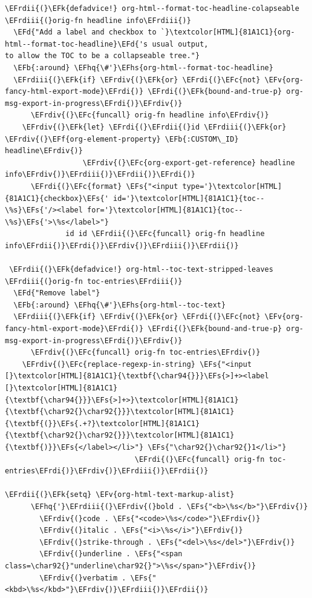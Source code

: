 \documentclass{scrartcl}
\newcommand{\EFk}[1]{\textcolor{EFk}{#1}} %
\newcommand{\EFd}[1]{\textcolor{EFd}{#1}} %
\newcommand{\EFs}[1]{\textcolor{EFs}{#1}} %
\newcommand{\EFb}[1]{\textcolor{EFb}{#1}} %
\newcommand{\EFc}[1]{\textcolor{EFc}{#1}} %
\newcommand{\EFv}[1]{\textcolor{EFv}{#1}} %
\newcommand{\EFf}[1]{\textcolor{EFf}{#1}} %
\newcommand{\EFhq}[1]{#1} %
\newcommand{\EFhs}[1]{#1} %
\newcommand{\EFrdi}[1]{#1} %
\newcommand{\EFrdii}[1]{#1} %
\newcommand{\EFrdiii}[1]{#1} %
\newcommand{\EFrdiv}[1]{#1} %
\begin{document}
\begin{Code}
\begin{Verbatim}[]
\EFrdii{(}\EFk{defadvice!} org-html--format-toc-headline-colapseable \EFrdiii{(}orig-fn headline info\EFrdiii{)}
  \EFd{"Add a label and checkbox to `}\textcolor[HTML]{81A1C1}{org-html--format-toc-headline}\EFd{'s usual output,
to allow the TOC to be a collapseable tree."}
  \EFb{:around} \EFhq{\#'}\EFhs{org-html--format-toc-headline}
  \EFrdiii{(}\EFk{if} \EFrdiv{(}\EFk{or} \EFrdi{(}\EFc{not} \EFv{org-fancy-html-export-mode}\EFrdi{)} \EFrdi{(}\EFk{bound-and-true-p} org-msg-export-in-progress\EFrdi{)}\EFrdiv{)}
      \EFrdiv{(}\EFc{funcall} orig-fn headline info\EFrdiv{)}
    \EFrdiv{(}\EFk{let} \EFrdi{(}\EFrdii{(}id \EFrdiii{(}\EFk{or} \EFrdiv{(}\EFf{org-element-property} \EFb{:CUSTOM\_ID} headline\EFrdiv{)}
                  \EFrdiv{(}\EFc{org-export-get-reference} headline info\EFrdiv{)}\EFrdiii{)}\EFrdii{)}\EFrdi{)}
      \EFrdi{(}\EFc{format} \EFs{"<input type='}\textcolor[HTML]{81A1C1}{checkbox}\EFs{' id='}\textcolor[HTML]{81A1C1}{toc--\%s}\EFs{'/><label for='}\textcolor[HTML]{81A1C1}{toc--\%s}\EFs{'>\%s</label>"}
              id id \EFrdii{(}\EFc{funcall} orig-fn headline info\EFrdii{)}\EFrdi{)}\EFrdiv{)}\EFrdiii{)}\EFrdii{)}

 \EFrdii{(}\EFk{defadvice!} org-html--toc-text-stripped-leaves \EFrdiii{(}orig-fn toc-entries\EFrdiii{)}
  \EFd{"Remove label"}
  \EFb{:around} \EFhq{\#'}\EFhs{org-html--toc-text}
  \EFrdiii{(}\EFk{if} \EFrdiv{(}\EFk{or} \EFrdi{(}\EFc{not} \EFv{org-fancy-html-export-mode}\EFrdi{)} \EFrdi{(}\EFk{bound-and-true-p} org-msg-export-in-progress\EFrdi{)}\EFrdiv{)}
      \EFrdiv{(}\EFc{funcall} orig-fn toc-entries\EFrdiv{)}
    \EFrdiv{(}\EFc{replace-regexp-in-string} \EFs{"<input [}\textcolor[HTML]{81A1C1}{\textbf{\char94{}}}\EFs{>]+><label [}\textcolor[HTML]{81A1C1}{\textbf{\char94{}}}\EFs{>]+>}\textcolor[HTML]{81A1C1}{\textbf{\char92{}\char92{}}}\textcolor[HTML]{81A1C1}{\textbf{(}}\EFs{.+?}\textcolor[HTML]{81A1C1}{\textbf{\char92{}\char92{}}}\textcolor[HTML]{81A1C1}{\textbf{)}}\EFs{</label></li>"} \EFs{"\char92{}\char92{}1</li>"}
                              \EFrdi{(}\EFc{funcall} orig-fn toc-entries\EFrdi{)}\EFrdiv{)}\EFrdiii{)}\EFrdii{)}

\EFrdii{(}\EFk{setq} \EFv{org-html-text-markup-alist}
      \EFhq{'}\EFrdiii{(}\EFrdiv{(}bold . \EFs{"<b>\%s</b>"}\EFrdiv{)}
        \EFrdiv{(}code . \EFs{"<code>\%s</code>"}\EFrdiv{)}
        \EFrdiv{(}italic . \EFs{"<i>\%s</i>"}\EFrdiv{)}
        \EFrdiv{(}strike-through . \EFs{"<del>\%s</del>"}\EFrdiv{)}
        \EFrdiv{(}underline . \EFs{"<span class=\char92{}"underline\char92{}">\%s</span>"}\EFrdiv{)}
        \EFrdiv{(}verbatim . \EFs{"<kbd>\%s</kbd>"}\EFrdiv{)}\EFrdiii{)}\EFrdii{)}


\end{Verbatim}
\end{Code}
\end{document}
